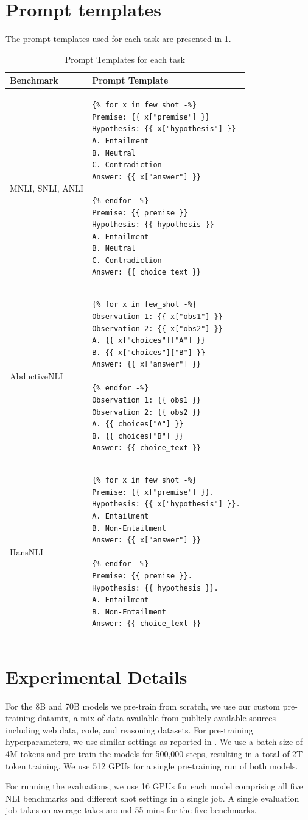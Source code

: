 \section{Prompt templates}

The prompt templates used for each task are presented in \cref{tab:prompt_template}.

\begin{table}[t]
    \centering
    \small
    \begin{tabular}{lp{8cm}}
        \textbf{Benchmark} & \textbf{Prompt Template} \\
        \midrule
        MNLI, SNLI, ANLI & \begin{verbatim}
{% for x in few_shot -%}
Premise: {{ x["premise"] }}
Hypothesis: {{ x["hypothesis"] }}
A. Entailment
B. Neutral
C. Contradiction
Answer: {{ x["answer"] }}

{% endfor -%}
Premise: {{ premise }}
Hypothesis: {{ hypothesis }}
A. Entailment
B. Neutral
C. Contradiction
Answer: {{ choice_text }}
\end{verbatim} \\
\midrule
AbductiveNLI & \begin{verbatim}
{% for x in few_shot -%}
Observation 1: {{ x["obs1"] }}
Observation 2: {{ x["obs2"] }}
A. {{ x["choices"]["A"] }}
B. {{ x["choices"]["B"] }}
Answer: {{ x["answer"] }}

{% endfor -%}
Observation 1: {{ obs1 }}
Observation 2: {{ obs2 }}
A. {{ choices["A"] }}
B. {{ choices["B"] }}
Answer: {{ choice_text }}
\end{verbatim} \\
\midrule
HansNLI & \begin{verbatim}
{% for x in few_shot -%}
Premise: {{ x["premise"] }}.
Hypothesis: {{ x["hypothesis"] }}.
A. Entailment
B. Non-Entailment
Answer: {{ x["answer"] }}

{% endfor -%}
Premise: {{ premise }}.
Hypothesis: {{ hypothesis }}.
A. Entailment
B. Non-Entailment
Answer: {{ choice_text }}
\end{verbatim} \\
\end{tabular}
\caption{Prompt Templates for each task}
\label{tab:prompt_template}
\end{table}

\section{Experimental Details}
\label{appx:experiments}

For the 8B and 70B models we pre-train from scratch, we use our custom pre-training datamix, a mix of data available from publicly available sources including web data, code, and reasoning datasets. 
For pre-training hyperparameters, we use similar settings as reported in \citet{dubey2024llama}. 
We use a batch size of 4M tokens and pre-train the models for 500,000 steps, resulting in a total of 2T token training. 
We use 512 GPUs for a single pre-training run of both models.

For running the evaluations, we use 16 GPUs for each model comprising all five NLI benchmarks and different shot settings in a single job. 
A single evaluation job takes on average takes around 55 mins for the five benchmarks.
